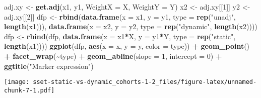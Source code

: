\documentclass[
]{article}
\newenvironment{Shaded}{\begin{snugshade}}{\end{snugshade}}
\newcommand{\AttributeTok}[1]{\textcolor[rgb]{0.13,0.29,0.53}{#1}}
\newcommand{\CommentTok}[1]{\textcolor[rgb]{0.56,0.35,0.01}{\textit{#1}}}
\newcommand{\DecValTok}[1]{\textcolor[rgb]{0.00,0.00,0.81}{#1}}
\newcommand{\FunctionTok}[1]{\textcolor[rgb]{0.13,0.29,0.53}{\textbf{#1}}}
\newcommand{\NormalTok}[1]{#1}
\newcommand{\OtherTok}[1]{\textcolor[rgb]{0.56,0.35,0.01}{#1}}
\newcommand{\SpecialCharTok}[1]{\textcolor[rgb]{0.81,0.36,0.00}{\textbf{#1}}}
\newcommand{\StringTok}[1]{\textcolor[rgb]{0.31,0.60,0.02}{#1}}
\begin{document}
\begin{Shaded}
\begin{Highlighting}[]
\NormalTok{adj.xy }\OtherTok{\textless{}{-}} \FunctionTok{get.adj}\NormalTok{(x1, y1, }\AttributeTok{WeightX =}\NormalTok{ X, }\AttributeTok{WeightY =}\NormalTok{ Y)}
\NormalTok{x2 }\OtherTok{\textless{}{-}}\NormalTok{ adj.xy[[}\DecValTok{1}\NormalTok{]]}
\NormalTok{y2 }\OtherTok{\textless{}{-}}\NormalTok{ adj.xy[[}\DecValTok{2}\NormalTok{]]}
\NormalTok{dfp }\OtherTok{\textless{}{-}} \FunctionTok{rbind}\NormalTok{(}\FunctionTok{data.frame}\NormalTok{(}\AttributeTok{x =}\NormalTok{ x1, }\AttributeTok{y =}\NormalTok{ y1, }\AttributeTok{type =} \FunctionTok{rep}\NormalTok{(}\StringTok{"unadj"}\NormalTok{, }\FunctionTok{length}\NormalTok{(x1))),}
             \FunctionTok{data.frame}\NormalTok{(}\AttributeTok{x =}\NormalTok{ x2, }\AttributeTok{y =}\NormalTok{ y2, }\AttributeTok{type =} \FunctionTok{rep}\NormalTok{(}\StringTok{"dynamic"}\NormalTok{, }\FunctionTok{length}\NormalTok{(x2))))}
\NormalTok{dfp }\OtherTok{\textless{}{-}} \FunctionTok{rbind}\NormalTok{(dfp, }\FunctionTok{data.frame}\NormalTok{(}\AttributeTok{x =}\NormalTok{ x1}\SpecialCharTok{*}\NormalTok{X, }\AttributeTok{y =}\NormalTok{ y1}\SpecialCharTok{*}\NormalTok{Y, }\AttributeTok{type =} \FunctionTok{rep}\NormalTok{(}\StringTok{"static"}\NormalTok{, }\FunctionTok{length}\NormalTok{(x1))))}
\FunctionTok{ggplot}\NormalTok{(dfp, }\FunctionTok{aes}\NormalTok{(}\AttributeTok{x =}\NormalTok{ x, }\AttributeTok{y =}\NormalTok{ y, }\AttributeTok{color =}\NormalTok{ type)) }\SpecialCharTok{+} \FunctionTok{geom\_point}\NormalTok{() }\SpecialCharTok{+} \FunctionTok{facet\_wrap}\NormalTok{(}\SpecialCharTok{\textasciitilde{}}\NormalTok{type) }\SpecialCharTok{+}
  \FunctionTok{geom\_abline}\NormalTok{(}\AttributeTok{slope =} \DecValTok{1}\NormalTok{, }\AttributeTok{intercept =} \DecValTok{0}\NormalTok{) }\SpecialCharTok{+} \FunctionTok{ggtitle}\NormalTok{(}\StringTok{"Marker expression"}\NormalTok{)}
\end{Highlighting}
\end{Shaded}

\texttt{[image: sset-static-vs-dynamic\_cohorts-1-2\_files/figure-latex/unnamed-chunk-7-1.pdf]}

\begin{Shaded}
\end{Shaded}
\end{document}
